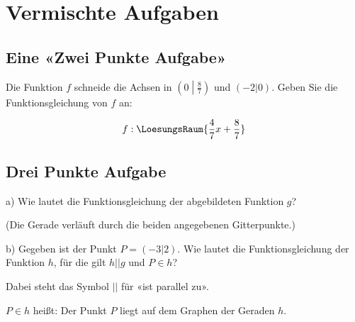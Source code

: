\section{Vermischte Aufgaben}

\subsection{Eine «Zwei Punkte Aufgabe»}
Die Funktion $f$ schneide die Achsen in $\left(0\middle|\frac87\right)$ und
$(-2|0)$. Geben Sie die Funktionsgleichung von $f$ an:

\vspace{20mm}

$$f: \LoesungsRaum{\frac47x + \frac87}$$


\subsection{Drei Punkte Aufgabe}


a) Wie lautet die Funktionsgleichung der abgebildeten Funktion $g$?

(Die Gerade verläuft durch die beiden angegebenen Gitterpunkte.)



b) Gegeben ist der Punkt $P=(-3|2)$. Wie lautet die Funktionsgleichung der Funktion $h$, für die gilt
$h||g$ und $P\in h$?

Dabei steht das Symbol $||$ für «ist parallel zu».

$P\in h$ heißt: Der Punkt $P$ liegt auf dem Graphen der Geraden $h$.


